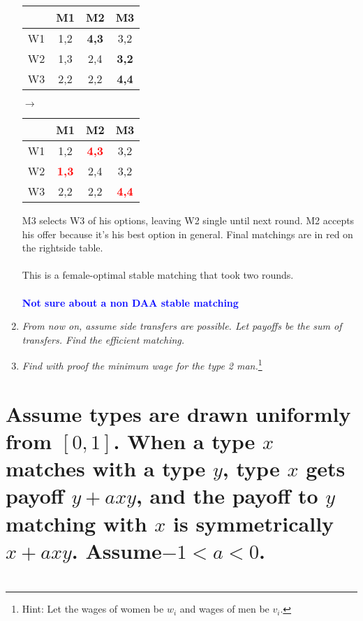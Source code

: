 \documentclass[]{article}
\newcommand{\fix} [1] {\textbf{\textcolor{blue}{#1}}} %
\begin{document}
\begin{enumerate}[label = (\alph*)]
\begin{center}
\begin{tabular}{|c|c|c|c|}
\hline 
               & M1 & M2 & M3 \\ 
\hline 
W1 & 1,2 & \textbf{4,3} & 3,2 \\ 
\hline 
W2 & 1,3 & 2,4 & \textbf{3,2} \\ 
\hline 
W3 & 2,2 & 2,2 & \textbf{4,4} \\ 
\hline 
\end{tabular} 
$\longrightarrow$
\begin{tabular}{|c|c|c|c|}
\hline 
               & M1 & M2 & M3 \\ 
\hline 
W1 & 1,2 & \textbf{\textcolor{red}{4,3}} & 3,2 \\ 
\hline 
W2 & \textbf{\textcolor{red}{1,3}} & 2,4 & 3,2 \\ 
\hline 
W3 & 2,2 & 2,2 & \textbf{\textcolor{red}{4,4}} \\ 
\hline 
\end{tabular} 
\end{center}
M3 selects W3 of his options, leaving W2 single until next round. M2 accepts his offer because it's his best option in general. Final matchings are in red on the rightside table.\\
\\

This is a female-optimal stable matching that took two rounds. 
\\\\
\fix{Not sure about a non DAA stable matching}


\item \textit{From now on,  assume side transfers are possible.  Let payoffs be the sum of transfers.  Find the efficient matching.}


\item \textit{Find with proof the minimum wage for the type 2 man.}\footnote{Hint: Let the wages of women be $w_i$ and wages of men be $v_i$.}

\end{enumerate}



\section{Assume types are drawn uniformly from $[0,1]$.  When a type $x $ matches with a type $y$, type $x$ gets payoff $y+axy$, and the payoff to $y$ matching with $ x$ is symmetrically $x+axy$.  Assume$-1< a <0$.}




\section{}
\end{document}
